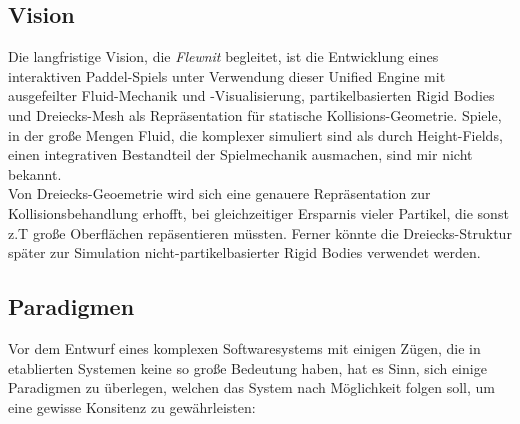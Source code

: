 
\subsection{Vision}

Die langfristige Vision, die \emph{Flewnit} begleitet, ist die Entwicklung eines interaktiven Paddel-Spiels unter Verwendung dieser Unified Engine mit ausgefeilter Fluid-Mechanik und -Visualisierung, partikelbasierten Rigid Bodies und Dreiecks-Mesh als Repräsentation für statische Kollisions-Geometrie. Spiele, in der große Mengen Fluid, die komplexer simuliert sind als durch Height-Fields,
einen integrativen Bestandteil der Spielmechanik ausmachen, sind mir nicht bekannt.\\
Von Dreiecks-Geoemetrie wird sich eine genauere Repräsentation zur Kollisionsbehandlung erhofft, bei gleichzeitiger Ersparnis vieler Partikel, die sonst z.T große Oberflächen repäsentieren müssten. Ferner könnte die Dreiecks-Struktur später zur Simulation nicht-partikelbasierter Rigid Bodies verwendet werden.



\subsection{Paradigmen}
\label{sec:paradigm}

Vor dem Entwurf eines komplexen Softwaresystems mit einigen Zügen, die in etablierten Systemen keine so große Bedeutung haben, hat es Sinn, sich einige Paradigmen zu überlegen, welchen das System nach Möglichkeit folgen soll, um eine gewisse Konsitenz zu gewährleisten:
	
